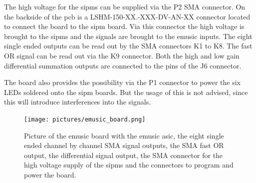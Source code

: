 The high voltage for the \acp{sipm} can be supplied via the P2 SMA connector.
On the backside of the \ac{pcb} is a LSHM-150-XX.-XXX-DV-AN-XX connector located to connect the board to the \ac{sipm} board.
Via this connector the high voltage is brought to the \acp{sipm} and the signals are brought to the \ac{emusic} inputs.
The eight single ended outputs can be read out by the SMA connectors K1 to K8.
The fast OR signal can be read out via the K9 connector.
Both the high and low gain differential summation outputs are connected to the pins of the J6 connector.

The board also provides the possibility via the P1 connector to power the six LEDs soldered onto the \ac{sipm} boards.
But the usage of this is not advised, since this will introduce interferences into the signals.


\begin{figure}
	\centering
	\texttt{[image: pictures/emusic\_board.png]}
	\caption[eMUSIC Board]{Picture of the \ac{emusic} board with the \ac{emusic} \ac{asic}, the eight single ended channel by channel SMA signal outputs, the SMA fast OR output, the differential signal output, the SMA connector for the high voltage supply of the \acp{sipm} and the connectors to program and power the board.}
	\label{fig:emusic_board}
\end{figure}





